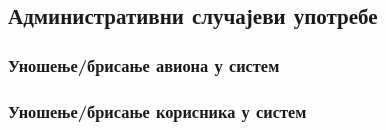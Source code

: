 \documentclass{article}
\begin{document}
\subsection{Административни случајеви употребе}

\subsubsection{Уношење/брисање авиона у систем}

\subsubsection{Уношење/брисање корисника у систем}
\end{document}
